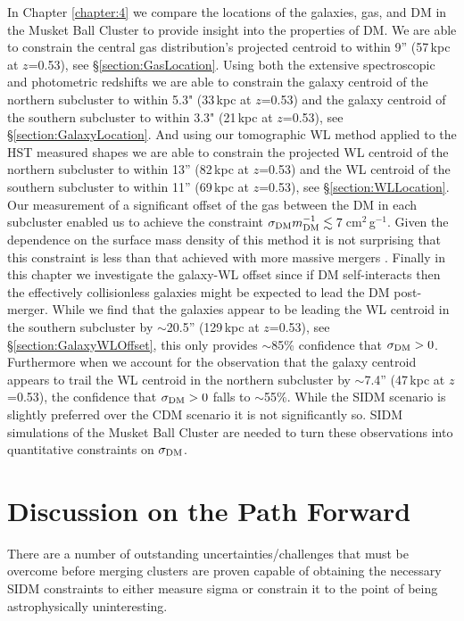 {In Chapter \ref{chapter:4} we compare the locations of the galaxies, gas, and DM in the Musket Ball Cluster to provide insight into the properties of DM.
We are able to constrain the central gas distribution's projected centroid to within 9'' (57\,kpc at $z$=0.53), see \S\ref{section:GasLocation}.
Using both the extensive spectroscopic and photometric redshifts we are able to constrain the galaxy centroid of the northern subcluster to within 5.3" (33\,kpc at $z$=0.53) and the galaxy centroid of the southern subcluster to within 3.3" (21\,kpc at $z$=0.53), see \S\ref{section:GalaxyLocation}.
And using our tomographic WL method applied to the HST measured shapes we are able to constrain the projected WL centroid of the northern subcluster to within 13'' (82\,kpc at $z$=0.53) and the WL centroid of the southern subcluster to within 11'' (69\,kpc at $z$=0.53), see \S\ref{section:WLLocation}.
Our measurement of a significant offset of the gas between the DM in each subcluster enabled us to achieve the constraint $\sigma_{\rm DM} m_{\rm DM}^{-1} \lesssim 7$\,cm$^2$\,g$^{-1}$.
Given the dependence on the surface mass density of this method it is not surprising that this constraint is less than that achieved with more massive mergers \citep{Markevitch:2004dl, Bradac:2008gw, Merten:2011gu}.
Finally in this chapter we investigate the galaxy-WL offset since if DM self-interacts then the effectively collisionless galaxies might be expected to lead the DM post-merger.
While we find that the galaxies appear to be leading the WL centroid in the southern subcluster by $\sim$20.5'' (129\,kpc at $z$=0.53), see \S\ref{section:GalaxyWLOffset}, this only provides $\sim$85\% confidence that $\sigma_{\rm DM}>0$.
Furthermore when we account for the observation that the galaxy centroid appears to trail the WL centroid in the northern subcluster by $\sim$7.4'' (47\,kpc at $z$=0.53), the confidence that $\sigma_{\rm DM}>0$ falls to $\sim$55\%.
While the SIDM scenario is slightly preferred over the CDM scenario it is not significantly so.
SIDM simulations of the Musket Ball Cluster are needed to turn these observations into quantitative constraints on $\sigma_{\rm DM}$.


\section{Discussion on the Path Forward}

There are a number of outstanding uncertainties/challenges that must be overcome before merging clusters are proven capable of obtaining the necessary SIDM constraints to either measure sigma or constrain it to the point of being astrophysically uninteresting.

}
